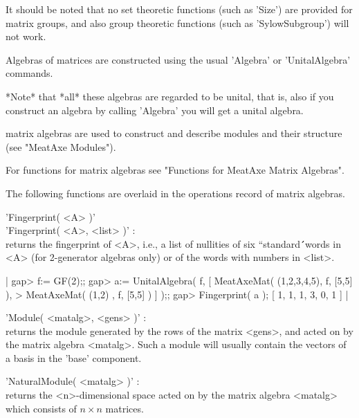 It should be noted that no set theoretic functions (such as 'Size') are
provided for {\MeatAxe} matrix groups, and also group theoretic functions
(such as 'SylowSubgroup') will not work.


Algebras of {\MeatAxe} matrices are constructed using the usual 'Algebra'
or 'UnitalAlgebra' commands.

*Note* that *all* these algebras are regarded to be unital, that is, also
if you construct an algebra by calling 'Algebra' you will get a unital
algebra.

{\MeatAxe} matrix algebras are used to construct and describe {\MeatAxe}
modules and their structure (see "MeatAxe Modules").

For functions for {\MeatAxe} matrix algebras see "Functions for MeatAxe
Matrix Algebras".


The following functions are overlaid in the operations record of
{\MeatAxe} matrix algebras.

'Fingerprint( <A> )'\\
'Fingerprint( <A>, <list> )' : \\
    returns the fingerprint of <A>, i.e., a list of nullities of
    six ``standard\'\'\ words in <A> (for 2-generator algebras only) or of
    the words with numbers in <list>.

|    gap> f:= GF(2);;
    gap> a:= UnitalAlgebra( f, [ MeatAxeMat( (1,2,3,4,5), f, [5,5] ),
    >                            MeatAxeMat( (1,2)      , f, [5,5] ) ] );;
    gap> Fingerprint( a );
    [ 1, 1, 1, 3, 0, 1 ] |

'Module( <matalg>, <gens> )' : \\
    returns the module generated by the rows of the {\MeatAxe} matrix <gens>,
    and acted on by the {\MeatAxe} matrix algebra <matalg>.
    Such a module will usually contain the vectors of a basis in the 'base'
    component.

'NaturalModule( <matalg> )' : \\
    returns the <n>-dimensional space acted on by the {\MeatAxe} matrix
    algebra <matalg> which consists of $n \times n$ {\MeatAxe} matrices.


